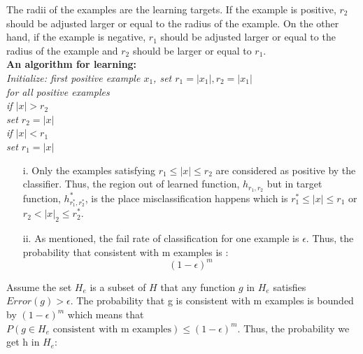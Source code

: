 \item[(a)]
The radii of the examples are the learning targets. If the example is positive, $r_2$ should be adjusted larger or equal to the radius of the example. On the other hand, if the example is negative, $r_1$ should be adjusted larger or equal to the radius of the example and $r_2$ should be larger or equal to $r_1$.\\
\textbf{An algorithm for learning: }\\ 
 \textit{Initialize: first positive example $x_1$, set $r_1 = |x_1|, r_2 = |x_1|$}\\
\textit{for all positive examples}\\
\hspace*{0cm} \textit{if $|x| > r_2$}\\
\hspace*{0.5cm} \textit{set $r_2 = |x|$}\\ 
\hspace*{0cm} \textit{if $|x| < r_1$}\\
\hspace*{0.5cm} \textit{set $r_1 = |x|$}\\ 
\item[(b)]
\begin{itemize}
\item[i.]
Only the examples satisfying  $r_1 \le |x| \le r_2$ are considered as positive by the classifier. Thus, the region out of learned function, $h_{r_1,r_2}$ but in target function, $h^*_{r_1^*,r_2^*}$, is the place misclassification happens which is $r_1^* \leq |x| \leq r_1$ or $r_2 < |x|_2 \leq r_2^*$.   
\item[ii.]
As mentioned, the fail rate of classification for one example is $\epsilon$. Thus, the probability that consistent with m examples is :
\begin{equation*}
	(1 - \epsilon)^m 
\end{equation*}
\end{itemize}
\item[(c)]
Assume the set $H_e$ is a subset of $H$ that any function $g$ in $H_e$ satisfies $Error(g) > \epsilon$. The probability that g is consistent with m examples is bounded by $(1 - \epsilon)^m $ which means that $P(g \in H_e\mbox{ consistent with m examples}) \le (1 - \epsilon)^m$. Thus, the probability we get h in $H_e$:

